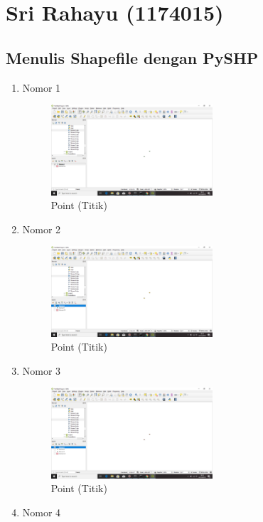 \section{Sri Rahayu (1174015)}
\subsection{Menulis Shapefile dengan PySHP}
\begin{enumerate}
	\item Nomor 1
	
	\begin{figure}[H]
		\includegraphics[width=6cm]{figures/1174015/2/No1.png}
		\centering
		\caption{Point (Titik)}
	\end{figure}
	\item Nomor 2
	
	\begin{figure}[H]
		\includegraphics[width=6cm]{figures/1174015/2/No2.png}
		\centering
		\caption{Point (Titik)}
	\end{figure}
	\item Nomor 3
	
	\begin{figure}[H]
		\includegraphics[width=6cm]{figures/1174015/2/No3.png}
		\centering
		\caption{Point (Titik)}
	\end{figure}
	\item Nomor 4
	
	\begin{figure}[H]

\end{figure}
\end{enumerate}
